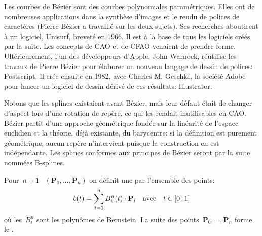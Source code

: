 \begin{histoire}
Les courbes de Bézier sont des courbes polynomiales paramétriques.  Elles ont de nombreuses applications dans la synthèse d'images et le rendu de polices de caractères (Pierre Bézier a travaillé sur les deux sujets). Ses recherches aboutirent à un logiciel, Unisurf, breveté en 1966. Il est à la base de tous les logiciels créés par la suite. Les concepts de CAO et de CFAO venaient de prendre forme. Ultérieurement, l'un des développeurs d'Apple, John Warnock, réutilise les travaux de Pierre Bézier pour élaborer un nouveau langage de dessin de polices: Postscript. Il crée ensuite en 1982, avec Charles M. Geschke, la société Adobe pour lancer un logiciel de dessin dérivé de ces résultats: Illustrator. 
\end{histoire}

Notons que les splines existaient avant Bézier, mais leur défaut était de changer d'aspect lors d'une rotation de repère, ce qui les rendait inutilisables en CAO. Bézier partit d'une approche géométrique fondée sur la linéarité de l'espace euclidien et la théorie, déjà existante, du barycentre: si la définition est purement géométrique, aucun repère n'intervient puisque la construction en est indépendante. Les splines conformes aux principes de Bézier seront par la suite nommées B-splines.  

Pour~$n+1$ ~$(\mathbf{P}_0, \dots, \mathbf{P}_n)$ on définit une  par l'ensemble des points:
\begin{equation}
b(t)=\displaystyle\sum_{i=0}^n B_i^n(t)\cdot\mathbf{P}_i\quad\text{avec}\quad t \in\mathopen{[}0\,;1\mathclose{]}
\end{equation}
où les~$B_i^n$ sont les polynômes de Bernstein. La suite des points~$\mathbf{P}_0,\ldots,\mathbf{P}_n$ forme le . 

